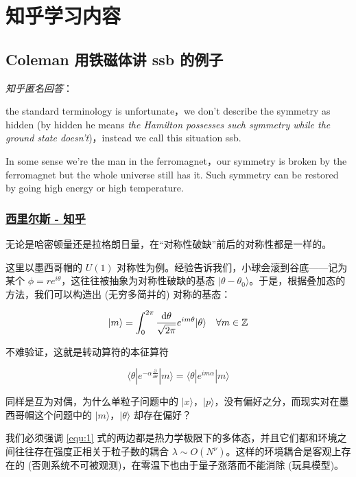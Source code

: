 \chapter{知乎学习内容}

\section{Coleman 用铁磁体讲 ssb 的例子}

\emph{知乎匿名回答}：

the standard terminology is unfortunate，we don't describe the symmetry as hidden (by hidden he means \emph{the Hamilton possesses such symmetry while the ground state doesn't})，instead we call this situation ssb.

In some sense we're the man in the ferromagnet，our symmetry is broken by the ferromagnet but the whole universe still has it. Such symmetry can be restored by going high energy or high temperature.

\subsection{\href{https://www.zhihu.com/people/imserious}{西里尔斯 - 知乎}}

无论是哈密顿量还是拉格朗日量，在“对称性破缺”前后的对称性都是一样的。

这里以墨西哥帽的 $U(1)$ 对称性为例。经验告诉我们，小球会滚到谷底——记为某个 $\phi=r e^{i \theta}$，这往往被抽象为对称性破缺的基态 $|\theta-\theta_0\rangle$。于是，根据叠加态的方法，我们可以构造出 (无穷多简并的) 对称的基态：

\begin{equation}
    |m\rangle = \int_0^{2\pi} \frac{\mathop{}\!\mathrm{d} \theta}{\sqrt{2\pi}} e^{im \theta} |\theta\rangle \quad \forall m \in \mathbb{Z}
    \label{equ:1}
\end{equation}

不难验证，这就是转动算符的本征算符

\begin{equation*}
    \langle\theta| e^{-\alpha \frac{\partial}{\partial \theta}} |m\rangle = \langle\theta| e^{im\alpha} |m\rangle
\end{equation*}

同样是互为对偶，为什么单粒子问题中的 $|x\rangle，|p\rangle$，没有偏好之分，而现实对在墨西哥帽这个问题中的 $|m\rangle，|\theta\rangle$ 却存在偏好？

我们必须强调 \eqref{equ:1} 式的两边都是热力学极限下的多体态，并且它们都和环境之间往往存在强度正相关于粒子数的耦合 $\lambda \sim O(N^\nu)$。这样的环境耦合是客观上存在的 (否则系统不可被观测)，在零温下也由于量子涨落而不能消除 (玩具模型)。

